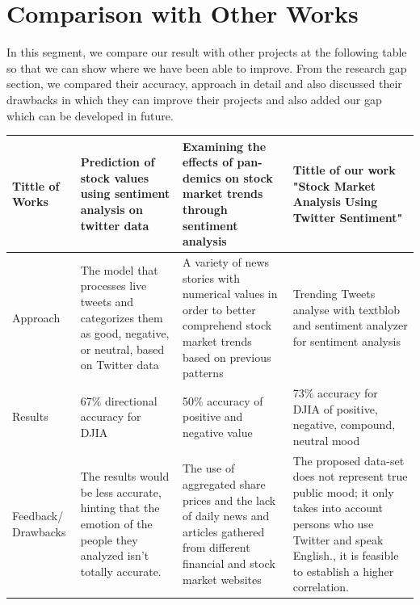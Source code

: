 \section{Comparison with Other Works}
In this segment, we compare our result with other projects at the following table so that we can show where we have been able to improve. From the research gap section, we compared their accuracy, approach in detail and also discussed their drawbacks in which they can improve their projects and also added our gap which can be developed in future.\\

\begin{tabular}{ |p{2cm}|p{4cm}|p{4cm}|p{4cm}| } 
 \hline Tittle of Works
&Prediction of stock values using sentiment analysis on
twitter data \cite{prasadinternational}
&Examining the effects of pan-demics on stock market trends through sentiment analysis\cite{biswas2020examining}
&Tittle of our work "Stock Market Analysis Using Twitter Sentiment"\\ 
 \hline
 Approach 
 &The model that processes live tweets and categorizes them as good, negative, or neutral, based on Twitter data
 &A variety of news stories with numerical values in order to better comprehend stock market trends based on previous patterns 
 &Trending Tweets analyse with textblob  and sentiment analyzer for sentiment analysis  \\ 
 \hline
 Results 
 &67\% directional accuracy for DJIA
 &50\% accuracy of positive and negative value 
 &73\% accuracy for DJIA of positive, negative, compound, neutral mood \\ 
 \hline
 Feedback/ Drawbacks 
 &The results would be less accurate, hinting that the emotion of the people they analyzed isn't totally accurate. 
 &The use of aggregated share prices and the lack of daily news and articles gathered from different financial and stock market websites 
 &The proposed data-set does not represent true public mood; it only takes into account persons who use Twitter and speak English., it is feasible to establish a higher correlation.  \\ 
 \hline
\end{tabular}\\